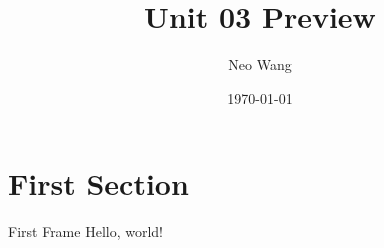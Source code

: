 \documentclass{beamer}
\title{Unit 03 Preview}
\date{\today}
\author{Neo Wang}
\institute{Westlake High School}
\begin{document}
  \maketitle
  \tableofcontents
  \section{First Section}
  \begin{frame}{First Frame}
    Hello, world!
  \end{frame}
\end{document}
